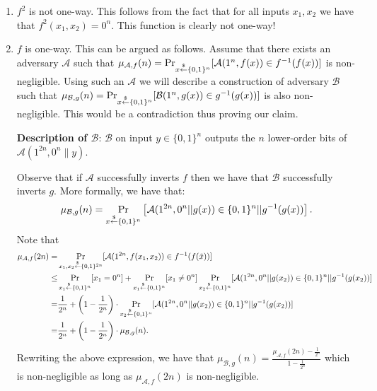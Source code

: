 \begin{enumerate}
  \item $f^2$ is not one-way. This follows from the fact that for all inputs $x_1, x_2$ we have that $f^2(x_1,x_2) = 0^n$. This function is clearly not one-way!
  \item $f$ is one-way. This can be argued as follows. Assume that there exists an adversary $\mathcal{A}$ such that $\mu_{\mathcal{A},f}(n) = \Pr_{x \stackrel{\$}{\leftarrow} \{ 0, 1 \}^{n}}[ \mathcal{A}(1^n, f(x)) \in f^{-1}(f(x))]$ is non-negligible. Using such an $\mathcal{A}$ we will describe a construction of adversary $\mathcal{B}$ such that $\mu_{\mathcal{B},g}(n) = \Pr_{x \stackrel{\$}{\leftarrow} \{ 0, 1 \}^{n}}[ \mathcal{B}(1^n, g(x)) \in g^{-1}(g(x))]$ is also non-negligible. This would be a contradiction thus proving our claim.

      \textbf{Description of $\mathcal{B}$}: $\mathcal{B}$ on input $y \in\{0,1\}^n$ outputs the $n$ lower-order bits of  $\mathcal{A}(1^{2n}, 0^{n}\|y)$.

      Observe that if $\mathcal{A}$ successfully inverts $f$ then we have that $\mathcal{B}$ successfully inverts $g$. More formally, we have that:
      $$\mu_{\mathcal{B},g}(n) = \Pr_{x \stackrel{\$}{\leftarrow} \{ 0, 1 \}^{n}}\left[ \mathcal{A}(1^{2n}, 0^n || g(x)) \in \{0,1\}^n || g^{-1}(g(x))\right].$$
      Note that
      \begin{align*}
      \mu_{\mathcal{A},f}(2n) =& \Pr_{x_1, x_2 \stackrel{\$}{\leftarrow} \{ 0, 1 \}^{2n}}[ \mathcal{A}(1^{2n}, f(x_1, x_2)) \in f^{-1}(f(\tilde x))]\\
      \leq & \Pr_{x_1 \stackrel{\$}{\leftarrow} \{ 0, 1 \}^{n}}[x_1 = 0^n] +  \Pr_{x_1 \stackrel{\$}{\leftarrow} \{ 0, 1 \}^{n}}[x_1 \neq 0^n] \Pr_{x_2 \stackrel{\$}{\leftarrow} \{ 0, 1 \}^{n}} [ \mathcal{A}(1^{2n}, 0^n || g(x_2)) \in \{0,1\}^n || g^{-1}(g(x_2))]\\
      = & \frac{1}{2^n} + \left( 1-\frac{1}{2^n}\right)\cdot\Pr_{x_2 \stackrel{\$}{\leftarrow} \{ 0, 1 \}^{n}} [ \mathcal{A}(1^{2n}, 0^n || g(x_2)) \in \{0,1\}^n || g^{-1}(g(x_2))]\\
      = & \frac{1}{2^n} + \left( 1-\frac{1}{2^n}\right)\cdot\mu_{\mathcal{B},g}(n).
      \end{align*}
      Rewriting the above expression, we have that $\mu_{\mathcal{B},g}(n) = \frac{\mu_{\mathcal{A},f}(2n) - \frac{1}{2^n}}{1- \frac{1}{2^n}}$ which is non-negligible as long as $\mu_{\mathcal{A},f}(2n)$  is non-negligible.
\end{enumerate}


